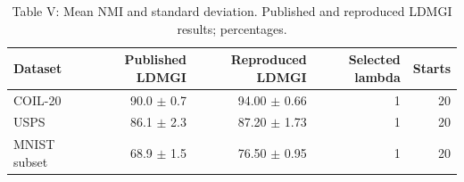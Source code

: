 \begin{table}[ht]
\centering
\caption{Table V: Mean NMI and standard deviation. Published and reproduced LDMGI results; percentages.}
\begin{tabular}{lrrrr}
\toprule
Dataset & Published LDMGI & Reproduced LDMGI & Selected lambda & Starts \\
\midrule
COIL-20 & 90.0 $\pm$ 0.7 & 94.00 $\pm$ 0.66 & 1 & 20 \\
USPS & 86.1 $\pm$ 2.3 & 87.20 $\pm$ 1.73 & 1 & 20 \\
MNIST subset & 68.9 $\pm$ 1.5 & 76.50 $\pm$ 0.95 & 1 & 20 \\
\bottomrule
\end{tabular}
\end{table}
